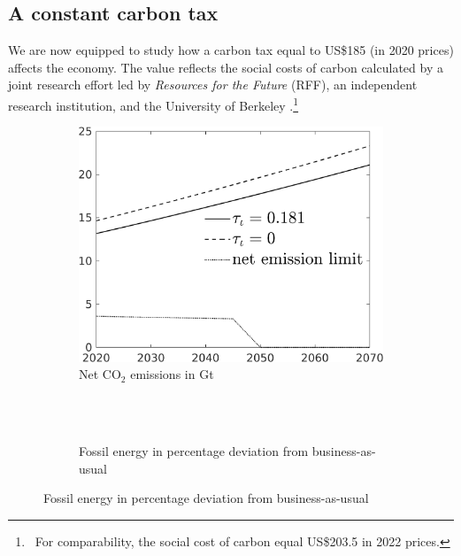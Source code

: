 \subsection{A constant carbon tax}\label{subsec:exp}


We are now equipped to study how a carbon tax  equal to US\$185 (in 2020 prices) affects the economy. The value reflects the social costs of carbon calculated by a joint research effort led by \textit{Resources for the Future} (RFF), an independent research institution, and the University of Berkeley \citep{Rennert2022ComprehensiveCO2}.\footnote{\  For comparability, the social cost of carbon equal US\$203.5 in 2022 prices.}


\begin{figure}[h!!]
	\centering
	\caption{A constant carbon tax equal to US\$185 (2020 prices) per ton of carbon  }\label{fig:Leveltauf_nsk0_xgr0_know}		
\begin{subfigure}[]{0.4\textwidth}
	\caption{Net CO$_2$ emissions in Gt \\ \ }
	\includegraphics[width=1\textwidth]{../../codding_model/own_basedOnFried/optimalPol_010922_revision/figures/all_13Sept22/CompTauf_bytaul_Reg5_Emnet_spillover0_nsk0_xgr0_knspil0_sep0_LFlimit0_emsbase0_countec0_GovRev0_etaa0.79_lgd1.png}
\end{subfigure}	
 \begin{minipage}[]{0.1\textwidth}
	\
\end{minipage}
\begin{subfigure}[]{0.4\textwidth}
\caption{Fossil energy in percentage deviation from business-as-usual}

\end{subfigure}
\end{figure}
